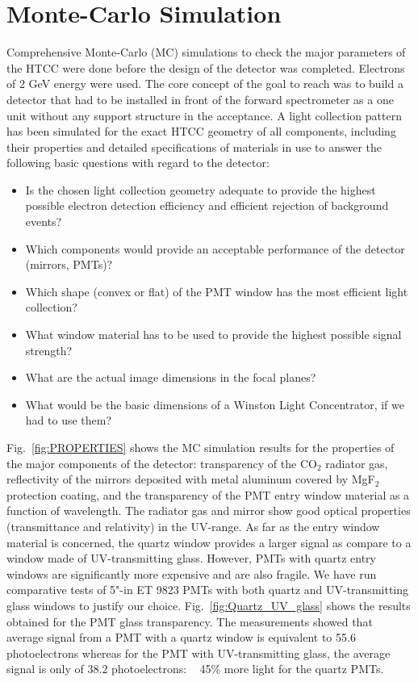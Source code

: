 \section{Monte-Carlo Simulation} 
Comprehensive Monte-Carlo (MC) simulations to check the major parameters of the HTCC were done before the design of the detector was completed. Electrons of 2 GeV energy were used. The core concept of the goal to reach was to build a detector that had to be installed in front of the forward spectrometer as a one unit without any support structure in the acceptance. A light collection pattern has been simulated for the exact HTCC geometry of all components, including their properties and detailed  specifications of materials in use to answer the following basic questions with regard to the detector:

\begin{itemize}
\item Is the chosen light collection geometry adequate to provide the highest possible electron detection efficiency and efficient rejection of background events?
\item Which components would provide an acceptable performance of the detector (mirrors, PMTs)?
\item Which shape (convex or flat) of the PMT window has the most efficient light collection?
\item What window material has to be used to provide the highest possible signal strength?
\item What are the actual image dimensions in the focal planes?
\item What would be the basic dimensions of a Winston Light Concentrator, if we had to use them?
\end{itemize}

Fig.~\ref{fig:PROPERTIES} shows the MC simulation results for the properties of the major components of the detector: transparency of the CO$_2$ radiator gas, reflectivity of the mirrors deposited with metal aluminum covered by MgF$_2$ protection coating, and the transparency of the PMT entry window material as a function of wavelength. The radiator gas and mirror show good optical properties (transmittance and relativity) in the UV-range. As far as the entry window material is concerned, the quartz window provides a larger signal as compare to a window made of UV-transmitting glass. However, PMTs with quartz entry windows are significantly more expensive and are also fragile. We have run comparative tests of 5"-in ET 9823 PMTs with both quartz and UV-transmitting glass windows to justify our choice. Fig.~\ref{fig:Quartz_UV_glass} shows the results obtained for the PMT glass transparency. The measurements showed that average signal from a PMT with a quartz window is equivalent to 55.6 photoelectrons whereas for the PMT with UV-transmitting glass, the average signal is only of 38.2 photoelectrons: ~ 45\% more light for the quartz PMTs.

